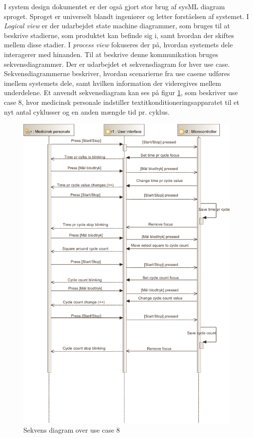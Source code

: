 	I system design dokumentet er der også gjort stor brug af sysML diagram sproget. Sproget er universelt blandt ingeniører og letter forståelsen af systemet. I \textit{Logical view} er der udarbejdet state machine diagrammer, som bruges til at beskrive stadierne, som produktet kan befinde sig i, samt hvordan der skiftes mellem disse stadier. I \textit{process view} fokuseres der på, hvordan systemets dele interagerer med hinanden. Til at beskrive denne kommunikation bruges sekvensdiagrammer. Der er udarbejdet et sekvensdiagram for hver use case. Sekvensdiagrammerne beskriver, hvordan scenarierne fra use casene udføres imellem systemets dele, samt hvilken information der videregives mellem underdelene. Et anvendt sekvensdiagram kan ses på figur \ref{fig:sekvenseks}, som beskriver use case 8, hvor medicinsk personale indstiller textit{konditioneringsapparatet} til et nyt antal cyklusser og en anden mængde tid pr. cyklus. 
	
	\begin{figure}[H]
		\centering
		\includegraphics[trim = {0 60 0 0}, clip, width = \textwidth]{billeder/SD-UC8.pdf}
		\caption{Sekvens diagram over use case 8}\label{fig:sekvenseks}
	\end{figure}
	
